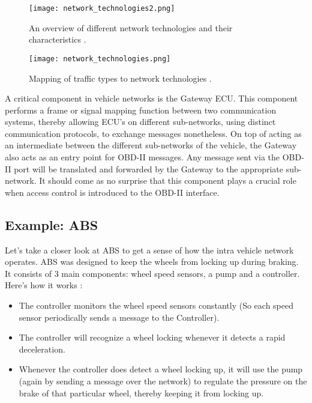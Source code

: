 \begin{figure}[h]
	\label{fig:network_technologies2}
	\centering
	\texttt{[image: network\_technologies2.png]}
	\caption{An overview of different network technologies and their characteristics \cite{Tuhoy}.}
\end{figure}

\begin{figure}[h]
	\label{fig:network_technologies}
	\centering
	\texttt{[image: network\_technologies.png]}
	\caption{Mapping of traffic types to network technologies \cite{Tuhoy}.}
\end{figure}

A critical component in vehicle networks is the Gateway ECU. This component performs a frame or signal mapping function between two communication systems, thereby allowing ECU's on different sub-networks, using distinct communication protocols, to exchange messages nonetheless. 
On top of acting as an intermediate between the different sub-networks of the vehicle, the Gateway also acts as an entry point for OBD-II messages. Any message sent via the OBD-II port will be translated and forwarded by the Gateway to the appropriate sub-network. It should come as no surprise that this component plays a crucial role when access control is introduced to the OBD-II interface.

\subsection{Example: ABS}
Let's take a closer look at ABS to get a sense of how the intra vehicle network operates. ABS was designed to keep the wheels from locking up during braking. It consists of 3 main components: wheel speed sensors, a pump and a controller. Here's how it works \cite{wiki:ABS}:

\begin{itemize}
	\item The controller monitors the wheel speed sensors constantly (So each speed sensor periodically sends a message to the Controller).
	
	\item The controller will recognize a wheel locking whenever it detects a rapid deceleration.
	
	\item Whenever the controller does detect a wheel locking up, it will use the pump (again by sending a message over the network) to regulate the pressure on the brake of that particular wheel, thereby keeping it from locking up.
\end{itemize}

